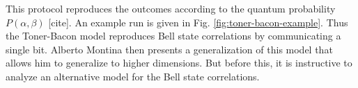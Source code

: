 \documentclass[a4paper]{article}
\begin{document}
    This protocol reproduces the outcomes according to the
    quantum probability $P(\alpha,\beta)$ [cite]. An example
    run is given in Fig. \ref{fig:toner-bacon-example}. Thus
    the Toner-Bacon model reproduces Bell state correlations
    by communicating a single bit. Alberto Montina then
    presents a generalization of this model that allows him
    to generalize to higher dimensions. But before this, it
    is instructive to analyze an alternative model for the
    Bell state correlations.
\end{document}

